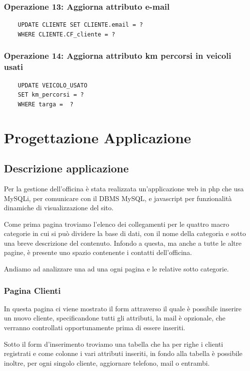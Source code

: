 \documentclass[a4paper,12pt]{report}
\begin{document}
\subsection*{Operazione 13: Aggiorna attributo e-mail}
\begin{lstlisting}
	UPDATE CLIENTE SET CLIENTE.email = ? 
	WHERE CLIENTE.CF_cliente = ?
\end{lstlisting}

\subsection*{Operazione 14: Aggiorna attributo km percorsi in veicoli usati}
\begin{lstlisting}
	UPDATE VEICOLO_USATO
	SET km_percorsi = ?
    WHERE targa =  ?
\end{lstlisting}

\chapter{Progettazione Applicazione}

\section{Descrizione applicazione}
Per la gestione dell'officina è stata realizzata un'applicazione web in php che usa MySQLi, per  
%
comunicare con il DBMS MySQL, e javascript per funzionalità dinamiche di visualizzazione del sito.

Come prima pagina troviamo l'elenco dei collegamenti per le quattro macro categorie in cui si può dividere la base 
%
di dati, con il nome della categoria e sotto una breve descrizione del contenuto. 
%
Infondo a questa, ma anche a tutte le altre pagine, è presente uno spazio contenente i contatti dell'officina.

Andiamo ad analizzare una ad una ogni pagina e le relative sotto categorie.

\subsection*{Pagina Clienti}
In questa pagina ci viene mostrato il form attraverso il quale è possibile inserire un nuovo cliente, specificandone
%
tutti gli attributi, la mail è opzionale, che verranno controllati opportunamente prima di essere inseriti.

Sotto il form d'inserimento troviamo una tabella che ha per righe i clienti registrati e come colonne i vari attributi	
%
inseriti, in fondo alla tabella è possibile inoltre, per ogni singolo cliente, aggiornare telefono, mail o entrambi.
\end{document}
